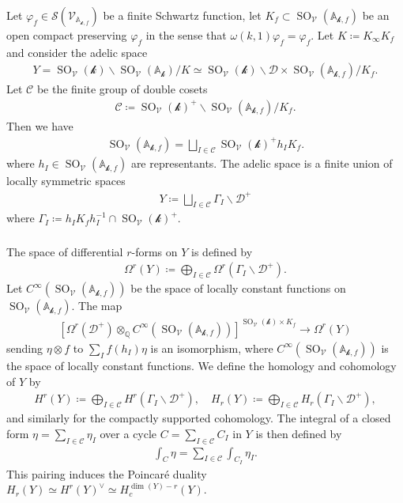 \documentclass[11pt]{article} %
\newcommand{\8}{\infty}
\newcommand{\kbf}{\mathcal{k}}
\newcommand{\SO}{\operatorname{SO}}
\newcommand{\D}{\mathcal{D}}
\newcommand{\A}{\mathbb{A}}
\newcommand{\Q}{\mathbb{Q}}
\newcommand{\Scal}{\mathcal{S}}
\newcommand{\Vcal}{\mathcal{V}}
\newcommand{\Ccal}{\mathcal{C}}
\newcommand{\fin}{f}
\theoremstyle{mytheoremstyle}
\theoremstyle{remark}
\numberwithin{equation}{section}
\begin{document}
\subsubsection{}Let $\varphi_\fin \in \Scal(\Vcal_{\A_{\kbf,\fin}})$ be a finite Schwartz function, let $K_\fin \subset \SO_{\Vcal}(\A_{\kbf,\fin})$ be an open compact preserving $\varphi_\fin$ in the sense that $\omega(k,1)\varphi_\fin=\varphi_\fin$. Let $K \coloneqq K_\8 K_\fin$ and consider the adelic space
\begin{align}
   Y=\SO_{\Vcal}(\kbf)\backslash \SO_{\Vcal}(\A_\kbf)/K \simeq \SO_{\Vcal}(\kbf)\backslash \D \times \SO_\Vcal(\A_{\kbf,\fin})/K_\fin.
\end{align}
Let $\Ccal$ be the finite group of double cosets
\begin{align}
    \Ccal \coloneqq \SO_\Vcal(\kbf)^+\backslash \SO_\Vcal(\A_{\kbf,\fin})/K_\fin.
\end{align}
Then we have
\begin{align}
 \SO_\Vcal(\A_{\kbf,\fin}) = \bigsqcup_{I \in \Ccal} \SO_\Vcal(\kbf)^+ h_I K_\fin.    
\end{align}
where $h_I \in \SO_\Vcal(\A_{\kbf,\fin})$ are representants. The adelic space is a finite union of locally symmetric spaces
\begin{align}
Y\coloneqq \bigsqcup_{I \in \Ccal} \Gamma_{I} \backslash \D^+   
\end{align}
where $\Gamma_{I} \coloneqq h_I K_\fin h_I^{-1} \cap \SO_\Vcal(\kbf)^+$.

\subsubsection{} The space of differential $r$-forms on $Y$ is defined by
\begin{align}
    \Omega^r(Y)\coloneqq \bigoplus_{I \in \Ccal} \Omega^r(\Gamma_I \backslash \D^+).
\end{align} Let $C^\8(\SO_\Vcal(\A_{\kbf,\fin}))$ be the space of locally constant functions on $\SO_\Vcal(\A_{\kbf,\fin})$. The map
\begin{align} \label{isoform2}
    \left [ \Omega^r(\D^+) \otimes_\Q C^\8(\SO_\Vcal(\A_{\kbf,\fin})) \right ]^{\SO_{\Vcal}(\kbf) \times K_\fin}  \longrightarrow \Omega^r(Y) \end{align}
sending $\eta \otimes f$ to $\sum_I f(h_I)\eta$ is an isomorphism, where $C^\8(\SO_\Vcal(\A_{\kbf,\fin}))$ is the space of locally constant functions. We define the homology and cohomology of $Y$ by
\begin{align}
 H^r(Y)\coloneqq \bigoplus_{I \in \Ccal} H^r(\Gamma_I \backslash \D^+), \quad   H_r(Y)\coloneqq \bigoplus_{I \in \Ccal} H_r(\Gamma_I \backslash \D^+),
\end{align}
and similarly for the compactly supported cohomology. The integral of a closed form $\eta=\sum_{I \in \Ccal} \eta_I$ over a cycle $C=\sum_{I \in \Ccal} C_{I}$ in $Y$ is then defined by
\begin{align}
    \int_C\eta=\sum_{I \in \Ccal} \int_{C_I}\eta_I.
\end{align} 
This pairing induces the Poincaré duality $H_r(Y) \simeq H^r(Y)^\vee \simeq H^{\dim(Y)-r}_c(Y)$.
\end{document}
